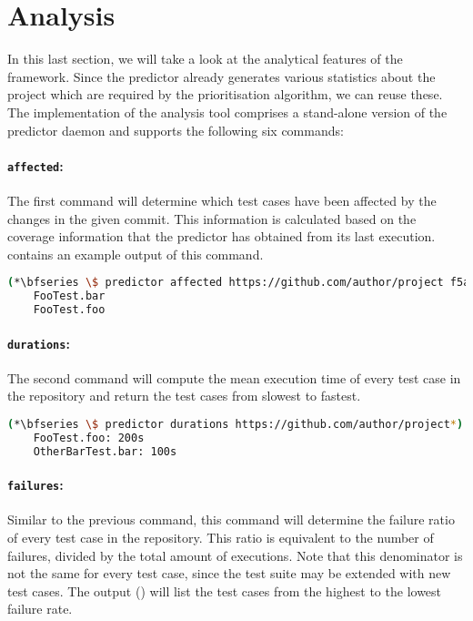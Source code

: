 
\section{Analysis}
In this last section, we will take a look at the analytical features of the framework. Since the predictor already generates various statistics about the project which are required by the prioritisation algorithm, we can reuse these. The implementation of the analysis tool comprises a stand-alone version of the predictor daemon and supports the following six commands:

\paragraph*{\texttt{affected}:} The first command will determine which test cases have been affected by the changes in the given commit. This information is calculated based on the coverage information that the predictor has obtained from its last execution.  contains an example output of this command.

\begin{lstlisting}[language=bash, caption=Output of the affected-command., label=lst:analysis-affected]
	(*\bfseries \$ predictor affected https://github.com/author/project f5a23e0*)
	FooTest.bar
	FooTest.foo
\end{lstlisting}

\paragraph*{\texttt{durations}:} The second command will compute the mean execution time of every test case in the repository and return the test cases from slowest to fastest.

\begin{lstlisting}[language=bash, caption=Output of the durations-command., label=lst:analysis-durations]
	(*\bfseries \$ predictor durations https://github.com/author/project*)
	FooTest.foo: 200s
	OtherBarTest.bar: 100s
\end{lstlisting}

\paragraph*{\texttt{failures}:} Similar to the previous command, this command will determine the failure ratio of every test case in the repository. This ratio is equivalent to the number of failures, divided by the total amount of executions. Note that this denominator is not the same for every test case, since the test suite may be extended with new test cases. The output () will list the test cases from the highest to the lowest failure rate.

